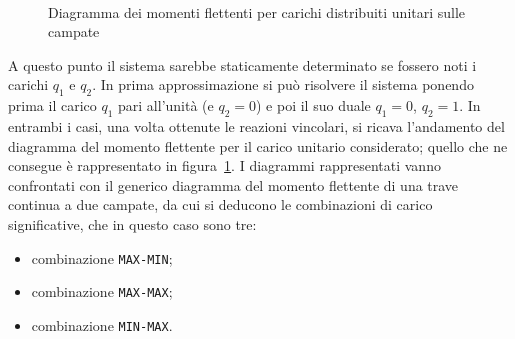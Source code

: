 \begin{figure}[ht!]
	\centering
	\\
	\caption{Diagramma dei momenti flettenti per carichi distribuiti unitari sulle campate}
	\label{fig:loadOnSpan}
\end{figure}

A questo punto il sistema sarebbe staticamente determinato se fossero noti i carichi $q_1$ e $q_2$. In prima approssimazione si può risolvere il sistema ponendo prima il carico $q_1$ pari all'unità (e $q_2 = 0$) e poi il suo duale $q_1 = 0$, $q_2 = 1$. In entrambi i casi, una volta ottenute le reazioni vincolari, si ricava l'andamento del diagramma del momento flettente per il carico unitario considerato; quello che ne consegue è rappresentato in figura~\ref{fig:loadOnSpan}. I diagrammi rappresentati vanno confrontati con il generico diagramma del momento flettente di una trave continua a due campate, da cui si deducono le combinazioni di carico significative, che in questo caso sono tre:
\begin{itemize}
	\item combinazione \texttt{MAX-MIN};
	\item combinazione \texttt{MAX-MAX};
	\item combinazione \texttt{MIN-MAX}.
\end{itemize}

